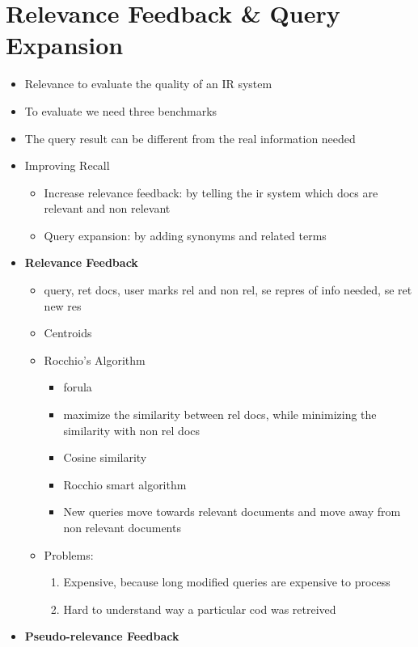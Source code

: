 \chapter{Relevance Feedback \& Query Expansion}
\begin{itemize}
    \item Relevance to evaluate the quality of an IR system
    \item To evaluate we need three benchmarks
    \item The query result can be different from the real information needed
    \item Improving Recall
    \begin{itemize}
        \item Increase relevance feedback: by telling the ir system which docs are relevant and non relevant
        \item Query expansion: by adding synonyms and related terms 
    \end{itemize}
    \item \textbf{Relevance Feedback}
    \begin{itemize}
        \item query, ret docs, user marks rel and non rel, se repres of info needed, se ret new res
        \item Centroids
        \item Rocchio's Algorithm
        \begin{itemize}
            \item forula
            \item maximize the similarity between rel docs, while minimizing the similarity with non rel docs
            \item Cosine similarity
            \item Rocchio smart algorithm
            \item New queries move towards relevant documents and move away from non relevant documents
        \end{itemize}
        \item Problems:
        \begin{enumerate}
            \item Expensive, because long modified queries are expensive to process
            \item Hard to understand way a particular cod was retreived
        \end{enumerate}
    \end{itemize}
    \item \textbf{Pseudo-relevance Feedback}

\end{itemize}
